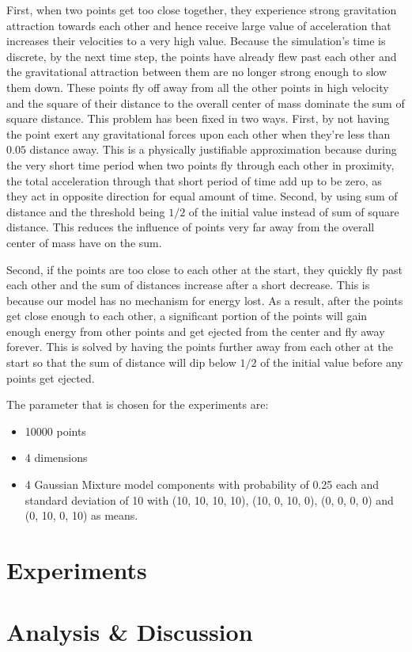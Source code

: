 \documentclass{article}
\begin{document}
First, when two points get too close together, they experience strong gravitation attraction towards
each other and hence receive large value of acceleration that increases their velocities to a very
high value. Because the simulation's time is discrete, by the next time step, the points have
already flew past each other and the gravitational attraction between them are no longer strong
enough to slow them down. These points fly off away from all the other points in high velocity and
the square of their distance to the overall center of mass dominate the sum of square distance. This
problem has been fixed in two ways. First, by not having the point exert any gravitational forces
upon each other when they're less than \(0.05\) distance away. This is a physically justifiable
approximation because during the very short time period when two points fly through each other in
proximity, the total acceleration through that short period of time add up to be zero, as they act
in opposite direction for equal amount of time. Second, by using sum of distance and the threshold
being \(1/2\) of the initial value instead of sum of square distance. This reduces the influence of
points very far away from the overall center of mass have on the sum.

Second, if the points are too close to each other at the start, they quickly fly past each other and
the sum of distances increase after a short decrease. This is because our model has no mechanism for
energy lost. As a result, after the points get close enough to each other, a significant portion of
the points will gain enough energy from other points and get ejected from the center and fly away
forever. This is solved by having the points further away from each other at the start so that the
sum of distance will dip below \(1/2\) of the initial value before any points get ejected.

The parameter that is chosen for the experiments are:
\begin{itemize}
	\item 10000 points
	\item 4 dimensions
	\item 4 Gaussian Mixture model components with probability of 0.25 each and standard deviation
		of 10 with (10, 10, 10, 10), (10, 0, 10, 0), (0, 0, 0, 0) and (0, 10, 0, 10) as means.
\end{itemize}

\section*{Experiments}

\section*{Analysis \& Discussion}
\end{document}
